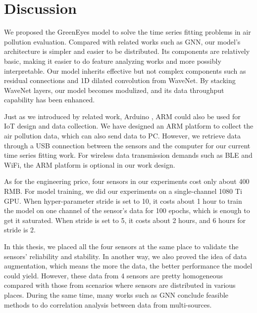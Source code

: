 
\chapter{Discussion}\label{chap:discussion}

We proposed the GreenEyes model to solve the time series fitting problems in air pollution evaluation. Compared with related works such as GNN, our model's architecture is simpler and easier to be distributed. Its components are relatively basic, making it easier to do feature analyzing works and more possibly interpretable. Our model inherits effective but not complex components such as residual connections and 1D dilated convolution from WaveNet. By stacking WaveNet layers, our model becomes modulized, and its data throughput capability has been enhanced.

Just as we introduced by related work, Arduino \cite{okokpujie2018smart}, ARM \cite{ailing2017design} could also be used for IoT design and data collection. We have designed an ARM platform to collect the air pollution data, which can also send data to PC. However, we retrieve data through a USB connection between the sensors and the computer for our current time series fitting work. For wireless data transmission demands such as BLE and WiFi, the ARM platform is optional in our work design.

As for the engineering price, four sensors in our experiments cost only about 400 RMB. For model training, we did our experiments on a single-channel 1080 Ti GPU. When hyper-parameter stride is set to 10, it costs about 1 hour to train the model on one channel of the sensor's data for 100 epochs, which is enough to get it saturated. When stride is set to 5, it costs about 2 hours, and 6 hours for stride is 2.

In this thesis, we placed all the four sensors at the same place to validate the sensors' reliability and stability. In another way, we also proved the idea of data augmentation, which means the more the data, the better performance the model could yield. However, these data from 4 sensors are pretty homogeneous compared with those from scenarios where sensors are distributed in various places. During the same time, many works such as GNN \cite{wu2020connecting} conclude feasible methods to do correlation analysis between data from multi-sources.

